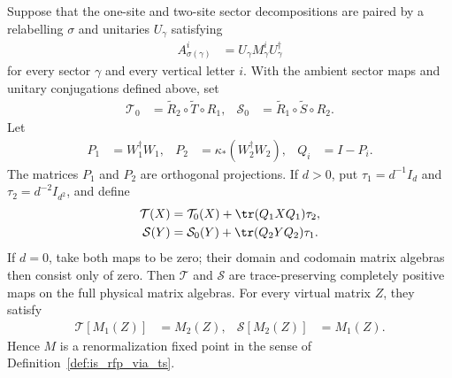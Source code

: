 \begin{lemma}
    \leanok
    Suppose that the one-site and two-site sector decompositions are paired by
    a relabelling $\sigma$ and unitaries $U_\gamma$ satisfying
    \begin{align}
        A_{\sigma(\gamma)}^i
         & =U_\gamma M_\gamma^i U_\gamma^\dagger
        \label{eq:mpdo_bnt_physical_channel_unitary_conjugacy}
    \end{align}
    for every sector $\gamma$ and every vertical letter $i$.  With the ambient
    sector maps and unitary conjugations defined above, set
    \begin{align}
        \mathcal T_0
         & =\widetilde R_2\circ\widetilde T\circ R_1,
         &
        \mathcal S_0
         & =\widetilde R_1\circ\widetilde S\circ R_2.
        \label{eq:mpdo_bnt_active_physical_maps}
    \end{align}
    Let
    \begin{align}
        P_1 & =W_1^\dagger W_1,
            &
        P_2 & =\kappa_\ast(W_2^\dagger W_2),
            &
        Q_i & =I-P_i.
        \label{eq:mpdo_bnt_physical_active_projections}
    \end{align}
    The matrices $P_1$ and $P_2$ are orthogonal projections.  If $d>0$, put
    $\tau_1=d^{-1}I_d$ and $\tau_2=d^{-2}I_{d^2}$, and define
    \begin{align}
        \mathcal T(X)
         & =\mathcal T_0(X)+\tr(Q_1XQ_1)\tau_2,
        \notag                                  \\
        \mathcal S(Y)
         & =\mathcal S_0(Y)+\tr(Q_2YQ_2)\tau_1.
        \label{eq:mpdo_bnt_completed_physical_maps}
    \end{align}
    If $d=0$, take both maps to be zero; their domain and codomain matrix
    algebras then consist only of zero.
    Then $\mathcal T$ and $\mathcal S$ are trace-preserving completely positive
    maps on the full physical matrix algebras.  For every virtual matrix $Z$,
    they satisfy
    \begin{align}
        \mathcal T[M_1(Z)] & =M_2(Z),
                           &
        \mathcal S[M_2(Z)] & =M_1(Z).
        \label{eq:mpdo_bnt_completed_physical_map_actions}
    \end{align}
    Hence $M$ is a renormalization fixed point in the sense of
    Definition~\ref{def:is_rfp_via_ts}.


\end{lemma}

